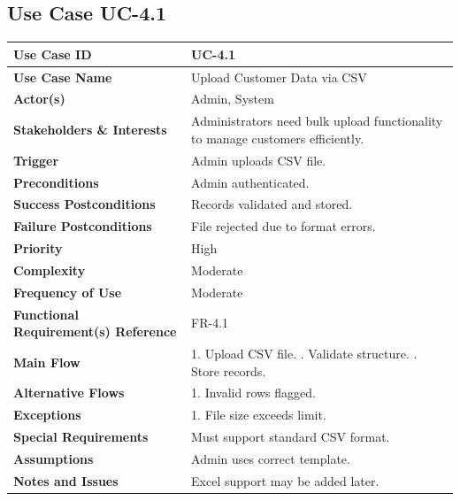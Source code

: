 \documentclass[12pt,a4paper]{report}
\begin{document}
\subsection*{Use Case UC-4.1}
\begin{longtable}{|p{4cm}|p{9cm}|}
\hline
\textbf{Use Case ID} & UC-4.1 \\ \hline
\textbf{Use Case Name} & Upload Customer Data via CSV \\ \hline
\textbf{Actor(s)} & Admin, System \\ \hline
\textbf{Stakeholders \& Interests} & Administrators need bulk upload functionality to manage customers efficiently. \\ \hline
\textbf{Trigger} & Admin uploads CSV file. \\ \hline
\textbf{Preconditions} & Admin authenticated. \\ \hline
\textbf{Success Postconditions} & Records validated and stored. \\ \hline
\textbf{Failure Postconditions} & File rejected due to format errors. \\ \hline
\textbf{Priority} & High \\ \hline
\textbf{Complexity} & Moderate \\ \hline
\textbf{Frequency of Use} & Moderate \\ \hline
\textbf{Functional Requirement(s) Reference} & FR-4.1 \\ \hline
\textbf{Main Flow} &
1. Upload CSV file. \newline
2. Validate structure. \newline
3. Store records. \\ \hline
\textbf{Alternative Flows} &
1. Invalid rows flagged. \\ \hline
\textbf{Exceptions} &
1. File size exceeds limit. \\ \hline
\textbf{Special Requirements} &
Must support standard CSV format. \\ \hline
\textbf{Assumptions} &
Admin uses correct template. \\ \hline
\textbf{Notes and Issues} &
Excel support may be added later. \\ \hline
\end{longtable}

\end{document}
